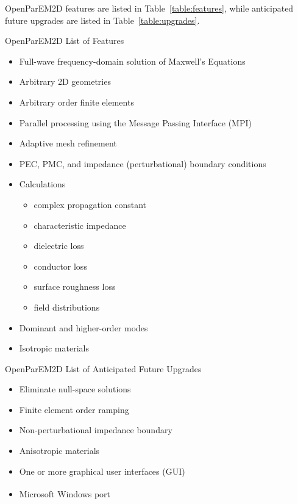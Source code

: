 \documentclass[titlepage]{article}
\renewcommand\_{\textunderscore\linebreak[1]}
\begin{document}
OpenParEM2D features are listed in Table~\ref{table:features}, while anticipated future upgrades are listed in Table~\ref{table:upgrades}.

\begin{table}[ht]
\caption{OpenParEM2D List of Features}
\noindent \hrulefill
\begin{itemize}[nosep]
  \item Full-wave frequency-domain solution of Maxwell's Equations
  \item Arbitrary 2D geometries
  \item Arbitrary order finite elements
  \item Parallel processing using the Message Passing Interface (MPI)
  \item Adaptive mesh refinement
  \item PEC, PMC, and impedance (perturbational) boundary conditions
  \item Calculations
  \begin{itemize}
    \item complex propagation constant
    \item characteristic impedance
    \item dielectric loss
    \item conductor loss
    \item surface roughness loss
    \item field distributions
  \end{itemize}
  \item Dominant and higher-order modes
  \item Isotropic materials
\end{itemize}
\noindent \hrulefill
\label{table:features}
\end{table}

\begin{table}[ht]
\caption{OpenParEM2D List of Anticipated Future Upgrades}
\noindent \hrulefill
\begin{itemize}[nosep]
   \item Eliminate null-space solutions
   \item Finite element order ramping
   \item Non-perturbational impedance boundary
   \item Anisotropic materials
   \item One or more graphical user interfaces (GUI)
   \item Microsoft Windows\textsuperscript{\textregistered} port
\end{itemize}
\noindent \hrulefill
\label{table:upgrades}
\end{table}
\end{document}

